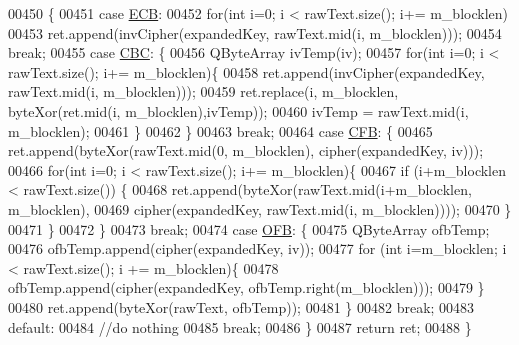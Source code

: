\begin{DoxyCode}
00450     \{
00451     \textcolor{keywordflow}{case} \mbox{\hyperlink{class_q_a_e_s_encryption_ad3e031c49a3d56566379d75b40b7b255a4ca7f51778e2adf1f464164a0ba8e75e}{ECB}}:
00452         \textcolor{keywordflow}{for}(\textcolor{keywordtype}{int} i=0; i < rawText.size(); i+= m\_blocklen)
00453             ret.append(invCipher(expandedKey, rawText.mid(i, m\_blocklen)));
00454         \textcolor{keywordflow}{break};
00455     \textcolor{keywordflow}{case} \mbox{\hyperlink{class_q_a_e_s_encryption_ad3e031c49a3d56566379d75b40b7b255a559bffc55d3599d0a172cc85aed98966}{CBC}}: \{
00456             QByteArray ivTemp(iv);
00457             \textcolor{keywordflow}{for}(\textcolor{keywordtype}{int} i=0; i < rawText.size(); i+= m\_blocklen)\{
00458                 ret.append(invCipher(expandedKey, rawText.mid(i, m\_blocklen)));
00459                 ret.replace(i, m\_blocklen, byteXor(ret.mid(i, m\_blocklen),ivTemp));
00460                 ivTemp = rawText.mid(i, m\_blocklen);
00461             \}
00462         \}
00463         \textcolor{keywordflow}{break};
00464     \textcolor{keywordflow}{case} \mbox{\hyperlink{class_q_a_e_s_encryption_ad3e031c49a3d56566379d75b40b7b255ae5e2e019df35c7d172fcd7f0ebec5e8e}{CFB}}: \{
00465             ret.append(byteXor(rawText.mid(0, m\_blocklen), cipher(expandedKey, iv)));
00466             \textcolor{keywordflow}{for}(\textcolor{keywordtype}{int} i=0; i < rawText.size(); i+= m\_blocklen)\{
00467                 \textcolor{keywordflow}{if} (i+m\_blocklen < rawText.size()) \{
00468                     ret.append(byteXor(rawText.mid(i+m\_blocklen, m\_blocklen),
00469                                        cipher(expandedKey, rawText.mid(i, m\_blocklen))));
00470                 \}
00471             \}
00472         \}
00473         \textcolor{keywordflow}{break};
00474     \textcolor{keywordflow}{case} \mbox{\hyperlink{class_q_a_e_s_encryption_ad3e031c49a3d56566379d75b40b7b255a27e2f82decd94080893d61db4a8adcb3}{OFB}}: \{
00475         QByteArray ofbTemp;
00476         ofbTemp.append(cipher(expandedKey, iv));
00477         \textcolor{keywordflow}{for} (\textcolor{keywordtype}{int} i=m\_blocklen; i < rawText.size(); i += m\_blocklen)\{
00478             ofbTemp.append(cipher(expandedKey, ofbTemp.right(m\_blocklen)));
00479         \}
00480         ret.append(byteXor(rawText, ofbTemp));
00481     \}
00482         \textcolor{keywordflow}{break};
00483     \textcolor{keywordflow}{default}:
00484         \textcolor{comment}{//do nothing}
00485         \textcolor{keywordflow}{break};
00486     \}
00487     \textcolor{keywordflow}{return} ret;
00488 \}

\end{DoxyCode}
